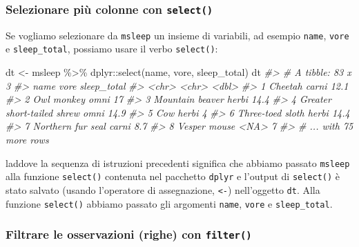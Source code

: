 \documentclass[
  11pt,
]{krantz}
\makeatletter
\newenvironment{Shaded}{\begin{snugshade}}{\end{snugshade}}
\newcommand{\CommentTok}[1]{\textcolor[rgb]{0.37,0.37,0.37}{\textit{#1}}}
\newcommand{\FunctionTok}[1]{\textcolor[rgb]{0,0,0}{#1}}
\newcommand{\NormalTok}[1]{#1}
\newcommand{\OtherTok}[1]{\textcolor[rgb]{0.37,0.37,0.37}{#1}}
\newcommand{\SpecialCharTok}[1]{\textcolor[rgb]{0,0,0}{#1}}
\newenvironment{kframe}{%
\medskip{}
\setlength{\fboxsep}{.8em}
 \def\at@end@of@kframe{}%
 \ifinner\ifhmode%
  \def\at@end@of@kframe{\end{minipage}}%
  \begin{minipage}{\columnwidth}%
 \fi\fi%
 \def\FrameCommand##1{\hskip\@totalleftmargin \hskip-\fboxsep
 \colorbox{shadecolor}{##1}\hskip-\fboxsep
     \hskip-\linewidth \hskip-\@totalleftmargin \hskip\columnwidth}%
 \MakeFramed {\advance\hsize-\width
   \@totalleftmargin\z@ \linewidth\hsize
   \@setminipage}}%
 {\par\unskip\endMakeFramed%
 \at@end@of@kframe}
\renewenvironment{Shaded}{\begin{kframe}}{\end{kframe}}
\theoremstyle{definition}
\theoremstyle{definition}
\theoremstyle{definition}
\theoremstyle{definition}
\theoremstyle{remark}
\makeatother
\begin{document}
\hypertarget{selezionare-piuxf9-colonne-con-select}{%
\subsubsection{\texorpdfstring{Selezionare più colonne con \texttt{select()}}{Selezionare più colonne con select()}}\label{selezionare-piuxf9-colonne-con-select}}

Se vogliamo selezionare da \texttt{msleep} un insieme di variabili, ad esempio \texttt{name}, \texttt{vore} e \texttt{sleep\_total}, possiamo usare il verbo \texttt{select()}:

\begin{Shaded}
\begin{Highlighting}[]
\NormalTok{dt }\OtherTok{\textless{}{-}}\NormalTok{ msleep }\SpecialCharTok{\%\textgreater{}\%}
\NormalTok{  dplyr}\SpecialCharTok{::}\FunctionTok{select}\NormalTok{(name, vore, sleep\_total)}
\NormalTok{dt}
\CommentTok{\#\textgreater{} \# A tibble: 83 x 3}
\CommentTok{\#\textgreater{}   name                       vore  sleep\_total}
\CommentTok{\#\textgreater{}   \textless{}chr\textgreater{}                      \textless{}chr\textgreater{}       \textless{}dbl\textgreater{}}
\CommentTok{\#\textgreater{} 1 Cheetah                    carni        12.1}
\CommentTok{\#\textgreater{} 2 Owl monkey                 omni         17  }
\CommentTok{\#\textgreater{} 3 Mountain beaver            herbi        14.4}
\CommentTok{\#\textgreater{} 4 Greater short{-}tailed shrew omni         14.9}
\CommentTok{\#\textgreater{} 5 Cow                        herbi         4  }
\CommentTok{\#\textgreater{} 6 Three{-}toed sloth           herbi        14.4}
\CommentTok{\#\textgreater{} 7 Northern fur seal          carni         8.7}
\CommentTok{\#\textgreater{} 8 Vesper mouse               \textless{}NA\textgreater{}          7  }
\CommentTok{\#\textgreater{} \# ... with 75 more rows}
\end{Highlighting}
\end{Shaded}

\noindent laddove la sequenza di istruzioni precedenti significa che abbiamo passato \texttt{msleep} alla funzione \texttt{select()} contenuta nel pacchetto \texttt{dplyr} e l'output di \texttt{select()} è stato salvato (usando l'operatore di assegnazione, \texttt{\textless{}-}) nell'oggetto \texttt{dt}. Alla funzione \texttt{select()} abbiamo passato gli argomenti \texttt{name}, \texttt{vore} e \texttt{sleep\_total}.

\hypertarget{filtrare-le-osservazioni-righe-con-filter}{%
\subsubsection{\texorpdfstring{Filtrare le osservazioni (righe) con \texttt{filter()}}{Filtrare le osservazioni (righe) con filter()}}\label{filtrare-le-osservazioni-righe-con-filter}}
\end{document}

